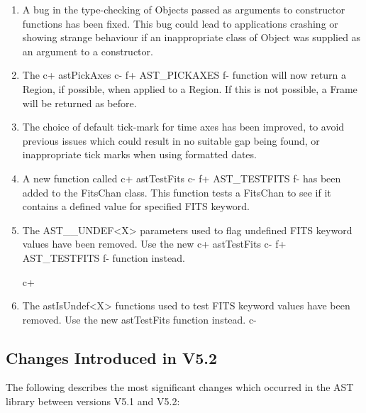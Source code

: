 \documentclass[twoside,11pt]{starlink}
\begin{document}
\begin{enumerate}
\item A bug in the type-checking of Objects passed as arguments to constructor
functions has been fixed. This bug could lead to applications crashing or
showing strange behaviour if an inappropriate class of Object was
supplied as an argument to a constructor.

\item The
c+
astPickAxes
c-
f+
AST\_PICKAXES
f-
function will now return a Region, if possible, when applied to a Region. If
this is not possible, a Frame will be returned as before.

\item The choice of default tick-mark for time axes has been improved, to avoid
previous issues which could result in no suitable gap being found, or
inappropriate tick marks when using formatted dates.

\item A new function called
c+
astTestFits
c-
f+
AST\_TESTFITS
f-
has been added to the FitsChan class. This function tests a FitsChan to
see if it contains a defined value for specified FITS keyword.

\item The AST\_\_UNDEF<X> parameters used to flag undefined FITS keyword values
have been removed. Use the new
c+
astTestFits
c-
f+
AST\_TESTFITS
f-
function instead.

c+
\item The astIsUndef<X> functions used to test FITS keyword values
have been removed. Use the new astTestFits function instead.
c-

\end{enumerate}

\subsection{Changes Introduced in V5.2}

The following describes the most significant changes which
occurred in the AST library between versions V5.1 and V5.2:
\end{document}
